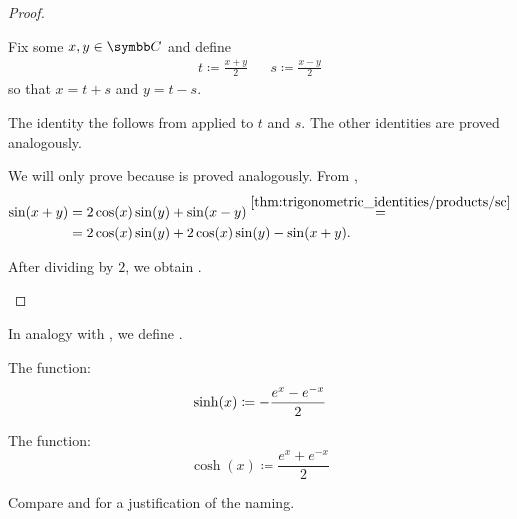 \begin{proof}
\begin{description}
     Fix some \( x, y \in \BC \) and define
    \begin{align*}
      t \coloneqq \frac {x + y} 2
      &&
      s \coloneqq \frac {x - y} 2
    \end{align*}
    so that \( x = t + s \) and \( y = t - s \).

    The identity  the follows from  applied to \( t \) and \( s \). The other identities are proved analogously.

     We will only prove  because  is proved analogously. From ,
    \begin{align*}
      \sin(x + y)
      &=
      2 \cos(x) \sin(y) + \sin(x - y)
      \overset {\ref{thm:trigonometric_identities/products/sc}} = \\ &=
      2 \cos(x) \sin(y) + 2 \cos(x) \sin(y) - \sin(x + y).
    \end{align*}

    After dividing by \( 2 \), we obtain .
  \end{description}
\end{proof}

\begin{definition}\label{def:hyperbolic_trigonometric_functions}
  In analogy with , we define .

  \begin{defenum}
     The  function:
    \begin{equation*}
      \sinh(x) \coloneqq - \frac {e^x - e^{-x}} 2 \\
    \end{equation*}

     The  function:
    \begin{equation*}
      \cosh(x) \coloneqq \frac {e^x + e^{-x}} 2
    \end{equation*}
  \end{defenum}

  Compare  and  for a justification of the naming.
\end{definition}

